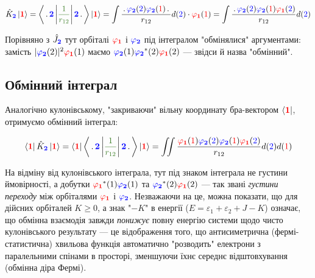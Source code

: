 \documentclass[]{article}
\def\ket#1{\left| #1 \right\rangle }
\def\bra#1{\left\langle #1 \right| }
\def\opbracket#1#2#3{\left\langle #1\left| \textcolor{OliveGreen}{#2}\right|  #3 \right\rangle}
\let\vphi\varphi
\let\ve\varepsilon
\def\f{(\textcolor{red}{1})}
\def\s{(\textcolor{blue}{2})}
\def\F{\textcolor{red}{\mathbf{1}}}
\def\S{\textcolor{blue}{\mathbf{2}}}
\def\oa{\textcolor{red}{ \vphi_{\mathbf{1}}} }
\def\ob{\textcolor{blue}{ \vphi_{\mathbf{2}}} }
\def\V{\frac{1}{r_{12}}}
\def\dt{\,.\,}
\begin{document}
\begin{equation*}
    \hat{K}_{\S}\ket{\F} = \opbracket{\dt\S}{\V}{\S\dt}\ket{\F} = \int \frac{\dt\ob\s \ob\f\dt}{r_{12}} d\s \cdot \oa\f = \int \frac{\dt\ob\s \ob\f\oa\s}{r_{12}} d\s
\end{equation*}

Порівняно з $\hat{J}_{\S}$ тут орбіталі $\oa$ і $\ob$ під інтегралом "обмінялися" аргументами: замість $|\ob(2)|^2\oa(1)$ маємо $\ob(1)\ob^*(2)\oa(2)$ --- звідси й назва "обмінний".

\subsection*{Обмінний інтеграл}

Аналогічно кулонівському, "закриваючи" вільну координату бра-вектором $\bra{\F}$, отримуємо обмінний інтеграл:

\begin{equation*}
    \bra{\F}\hat{K}_{\S}\ket{\F} = \bra{\F}\opbracket{\dt\S}{\V}{\S\dt}\ket{\F} = \iint \frac{\oa\f\ob\s \ob\f\oa\s}{r_{12}} d\s d\f
\end{equation*}

На відміну від кулонівського інтеграла, тут під знаком інтеграла не густини ймовірності, а добутки $\oa^*(1)\ob(1)$ та $\ob^*(2)\oa(2)$ --- так звані \emph{густини переходу} між орбіталями $\oa$ і $\ob$. Незважаючи на це, можна показати, що для дійсних орбіталей $K\ge0$, а знак "$-K$" в енергії ($E=\ve_1+\ve_2+J-K$) означає, що обмінна взаємодія завжди \emph{понижує} повну енергію системи щодо чисто кулонівського результату --- це відображення того, що антисиметрична (фермі-статистична) хвильова функція автоматично "розводить" електрони з паралельними спінами в просторі, зменшуючи їхнє середнє відштовхування (обмінна діра Фермі).
\end{document}
